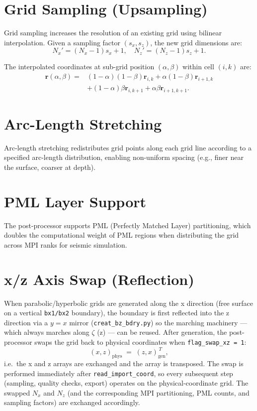 \documentclass[11pt,a4paper]{report}
\newcommand{\rvec}{\bm{r}}
\begin{document}
\section{Grid Sampling (Upsampling)}

Grid sampling increases the resolution of an existing grid using bilinear interpolation. Given a sampling factor $(s_x, s_z)$, the new grid dimensions are:
\begin{equation}
    N_x' = (N_x - 1) s_x + 1, \quad N_z' = (N_z - 1) s_z + 1.
\end{equation}

The interpolated coordinates at sub-grid position $(\alpha, \beta)$ within cell $(i, k)$ are:
\begin{equation}
\begin{split}
    \rvec(\alpha, \beta) = & (1-\alpha)(1-\beta) \rvec_{i,k} + \alpha(1-\beta) \rvec_{i+1,k} \\
    & + (1-\alpha)\beta \rvec_{i,k+1} + \alpha\beta \rvec_{i+1,k+1}.
\end{split}
\end{equation}

\section{Arc-Length Stretching}

Arc-length stretching redistributes grid points along each grid line according to a specified arc-length distribution, enabling non-uniform spacing (e.g., finer near the surface, coarser at depth).

\section{PML Layer Support}

The post-processor supports PML (Perfectly Matched Layer) partitioning, which doubles the computational weight of PML regions when distributing the grid across MPI ranks for seismic simulation.

\section{x/z Axis Swap (Reflection)}

When parabolic/hyperbolic grids are generated along the x direction (free surface on a vertical \texttt{bx1/bx2} boundary), the boundary is first reflected into the z direction via a $y=x$ mirror (\texttt{creat\_bz\_bdry.py}) so the marching machinery --- which always marches along $\zeta$ (z) --- can be reused. After generation, the post-processor swaps the grid back to physical coordinates when \texttt{flag\_swap\_xz = 1}:
\begin{equation}
    (x, z)_{\text{phys}} \;=\; (z, x)_{\text{gen}}^{\,T},
\end{equation}
i.e.\ the x and z arrays are exchanged and the array is transposed. The swap is performed immediately after \texttt{read\_import\_coord}, so every subsequent step (sampling, quality checks, export) operates on the physical-coordinate grid. The swapped $N_x$ and $N_z$ (and the corresponding MPI partitioning, PML counts, and sampling factors) are exchanged accordingly.
\end{document}
